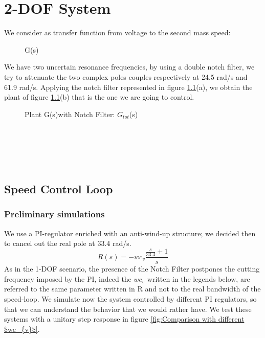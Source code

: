 	\chapter {2-DOF System}
We consider as transfer function from voltage to the second mass speed:

\begin{figure}[h]
	\centering
	\quad
	\caption{G(s)}
\end{figure}

We have two uncertain resonance frequencies, by using a double notch filter, we try to attenuate the two complex poles couples respectively at 24.5 rad/s and 61.9 rad/s.
\newline
Applying the notch filter represented in figure \ref{fig:Plant G(s)with Notch Filter2}(a), we obtain the plant of figure \ref{fig:Plant G(s)with Notch Filter2}(b) that is the one we are going to control.
\begin{figure}[h]
	\centering
	\quad
	\caption{Plant G(s)with Notch Filter: $G_{tot}$(s)}
	\label{fig:Plant G(s)with Notch Filter2}
\end{figure}
\\ \\ \\ \\
\section{Speed Control Loop}
\subsection{Preliminary simulations}
We use a PI-regulator enriched with an anti-wind-up structure; we decided then to cancel out the real pole at 33.4 rad/s.
\[
R(s)=-wc_v
\frac{\frac{s}{33.4}+1}{s}
\]
As in the 1-DOF scenario, the presence of the Notch Filter postpones the cutting frequency imposed by the PI, indeed the $wc_{v}$ written in the legends below, are referred to the same parameter written in R and not to the real bandwidth of the speed-loop.
\newline We simulate now the system controlled by different PI regulators, so that we can understand the behavior that we would rather have. We test these systems with a unitary step response in figure \ref{fig:Comparison with different $wc_{v}$}.

